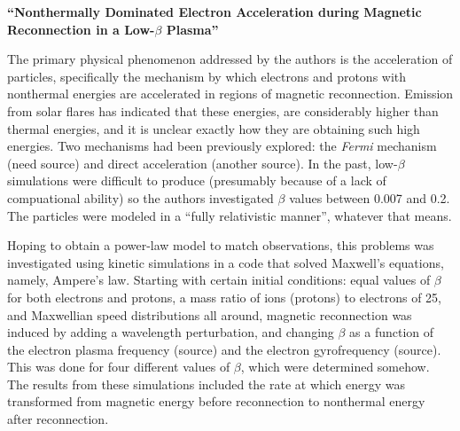 \documentclass[12pt]{article}
\begin{document}
\begin{center}\large\textbf{
``Nonthermally Dominated Electron Acceleration during Magnetic
Reconnection in a Low-\boldmath$\beta$ Plasma''}
\end{center}

The primary physical phenomenon addressed by the authors is the
acceleration of particles, specifically the mechanism by which
electrons and protons with nonthermal energies are accelerated
in regions of magnetic reconnection.
Emission from solar flares has indicated that
these energies, are considerably higher than thermal energies, and
it is unclear exactly how they are obtaining such high energies.
Two mechanisms had been previously explored:
the \emph{Fermi} mechanism (need source)
and direct acceleration (another source).
In the past, low-$\beta$ simulations were difficult to produce
(presumably because of a lack of compuational ability)
so the authors investigated $\beta$ values between 0.007 and 0.2.
The particles were modeled in a ``fully relativistic manner'',
whatever that means.

Hoping to obtain a power-law model to match observations, this
problems was investigated using kinetic simulations in a code 
that solved Maxwell's
equations, namely, Ampere's law. Starting with certain initial
conditions: equal values of $\beta$ for both electrons and protons, a
mass ratio of ions (protons) to electrons of 25, and Maxwellian speed
distributions all around, magnetic reconnection was induced by adding
a wavelength perturbation, and changing $\beta$ as a function of the
electron plasma frequency (source) and the electron gyrofrequency
(source). This was done for four different values of $\beta$,
which were determined somehow.
The results from these simulations included the rate at which energy
was transformed from magnetic energy before reconnection to nonthermal
energy after reconnection. 
\end{document}
